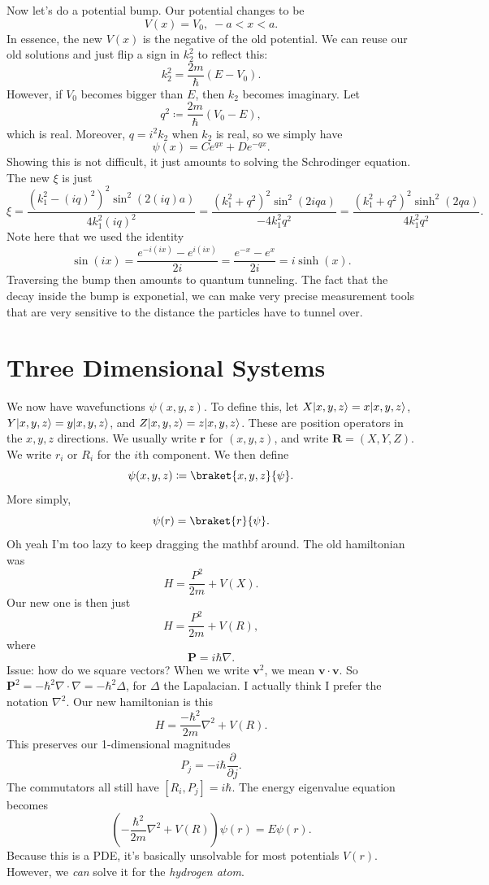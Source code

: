 Now let's do a potential bump. Our potential changes to be
\[
	V(x)=V_0,\; -a<x<a
.\]
In essence, the new $V(x)$ is the negative of the old potential. We can reuse our old solutions and just flip a sign in $k_2^2$ to reflect this:
\[
	k_2^2 = \frac{2m}{\hbar } \left( E-V_0 \right) 
.\]
However, if $V_0$ becomes bigger than $E$, then $k_2$ becomes imaginary. Let
\[
	q^2\coloneqq \frac{2m}{\hbar } \left( V_0-E \right) ,
\]
which is real. Moreover, $q=i^2k_2$ when $k_2$ is real, so we simply have
\[
	\psi (x)=Ce^{qx} +De^{-qx} 
.\]
Showing this is not difficult, it just amounts to solving the Schrodinger equation. The new $\xi $ is just
\[
	\xi =\frac{\left( k_1^2-(iq)^2 \right) ^2 \sin ^2\left( 2(iq)a \right) }{4k_1^2(iq)^2} =\frac{\left( k_1^2+q^2 \right) ^2 \sin ^2\left( 2iqa \right) }{-4k_1^2q^2} =\frac{\left( k_1^2+q^2 \right) ^2 \sinh^2\left( 2qa \right) }{4k_1^2q^2} 
.\]
Note here that we used the identity
\[
	\sin (ix)=\frac{e^{-i(ix)} -e^{i(ix)} }{2i} =\frac{e^{-x} -e^{x} }{2i} =i \sinh(x)
.\]
Traversing the bump then amounts to quantum tunneling. The fact that the decay inside the bump is exponetial, we can make very precise measurement tools that are very sensitive to the distance the particles have to tunnel over.

\chapter{Three Dimensional Systems}
We now have wavefunctions $\psi (x,y,z)$. To define this, let $X\lvert x,y,z\rangle =x\lvert x,y,z\rangle $, $Y\lvert x,y,z\rangle=y\lvert x,y,z\rangle $, and $Z\lvert x,y,z\rangle =z\lvert x,y,z\rangle $. These are position operators in the $x,y,z$ directions. We usually write $\mathbf{r} $ for $(x,y,z)$, and write $\mathbf{R} =(X,Y,Z)$. We write $r_i$ or $R_i$ for the $i$th component. We then define
\[
	\psi (x,y,z)\coloneqq \braket{x,y,z}{\psi } 
.\]
More simply,
\[
	\psi (r)=\braket{r}{\psi } 
.\]
Oh yeah I'm too lazy to keep dragging the mathbf around. The old hamiltonian was
\[
	H=\frac{P^2}{2m} +V(X)
.\]
Our new one is then just
\[
	H=\frac{P^2}{2m} +V(R),
\]
where
\[
	\mathbf{P} =i\hbar \nabla 
.\]
Issue: how do we square vectors? When we write $\mathbf{v} ^2$, we mean $\mathbf{v} \cdot \mathbf{v} $. So $\mathbf{P} ^2=-\hbar^2 \nabla \cdot \nabla =-\hbar^2 \Delta $, for $\Delta $ the Lapalacian. I actually think I prefer the notation $\nabla ^2$. Our new hamiltonian is this
\[
	H=\frac{-\hbar ^2}{2m} \nabla ^2 +V(R)
.\]
This preserves our 1-dimensional magnitudes
\[
	P_j = -i \hbar \frac{\partial }{\partial j} 
.\]
The commutators all still have $\left[ R_i,P_j \right] =i\hbar $. The energy eigenvalue equation becomes
\[
	\left(-\frac{\hbar ^2}{2m} \nabla ^2 +V(R)\right)\psi (r)=E\psi (r)
.\]
Because this is a PDE, it's basically unsolvable for most potentials $V(r)$. However, we \emph{can} solve it for the \emph{hydrogen atom}.


